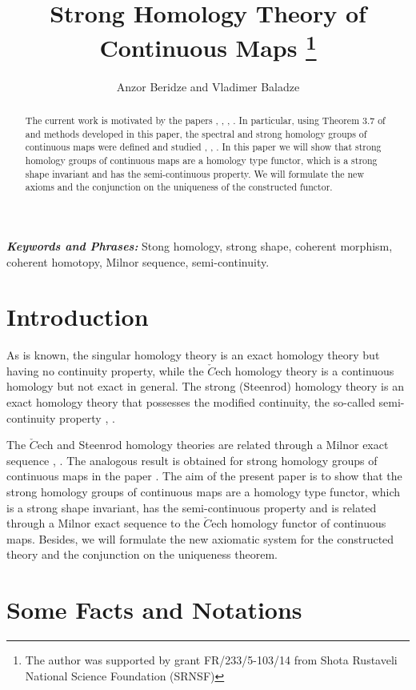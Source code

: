\documentclass[10pt]{article}
\title{Strong Homology Theory of Continuous Maps {\let\thefootnote\relax\footnote{The author was supported by grant FR/233/5-103/14 from Shota Rustaveli National Science Foundation (SRNSF)}}}
\date{\vspace{-5ex}}
\author{Anzor Beridze and Vladimer Baladze}
\affil{Department of Mathematics\\Batumi Shota Rustaveli  State University}
\theoremstyle{definition}
\providecommand{\keywords}[1]{\textbf{\textit{Keywords and Phrases:}} #1}
\begin{document}
\maketitle

\begin{abstract}The current work is motivated by the papers \cite{16}, \cite{18}, \cite{1901}, \cite{1902}. In particular, using Theorem 3.7 of \cite{16} and methods developed in this paper, the spectral and strong homology groups of continuous maps were defined and studied \cite{18}, \cite{1901}, \cite{1902}. In this paper we will show that strong homology groups of continuous maps are a homology type functor, which is a strong shape invariant and has the semi-continuous property. We will formulate the new axioms and the conjunction on the uniqueness of the constructed functor. 
\end{abstract}
\keywords{Stong homology, strong shape, coherent morphism, coherent homotopy, Milnor sequence, semi-continuity.}

\section*{Introduction}

As is known, the singular homology theory is an exact homology theory but having no continuity property, while the $\check{C}$ech homology
theory is a continuous homology but not exact in general. The strong (Steenrod) homology theory is an exact homology theory that possesses the modified continuity, the so-called semi-continuity property \cite{80}, \cite{9001}.

The $\check{C}$ech and Steenrod homology theories are related through
a Milnor exact sequence \cite{80}, \cite{9001}. The analogous result is obtained for strong homology groups of continuous maps in the paper \cite{1902}. The aim of the present paper is to show that the strong homology groups of continuous maps are a homology type functor, which is a strong shape invariant, has the semi-continuous property and is related through a Milnor exact sequence to the $\check{C}$ech homology functor of continuous maps. Besides, we will formulate the new axiomatic system for the constructed theory and the conjunction on the uniqueness theorem.  




\section{Some Facts and Notations}
\end{document}
